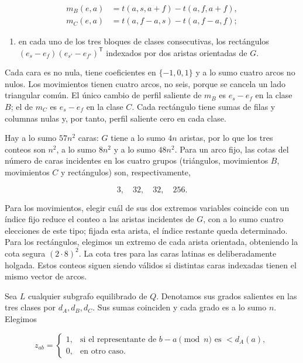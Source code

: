 \documentclass[spanish,11pt,a4paper]{article}
\providecommand{\tightlist}{\setlength{\itemsep}{0pt}\setlength{\parskip}{0pt}}
\begin{document}
\[\begin{aligned}m_B(e,a)&=t(a,s,a+f)-t(a,f,a+f),\\m_C(e,a)&=t(a,f-a,s)-t(a,f-a,f);\end{aligned}\]

\begin{enumerate}
\def\labelenumi{\arabic{enumi}.}
\setcounter{enumi}{2}
\tightlist
\item
  en cada uno de los tres bloques de clases consecutivas, los rectángulos \((e_s-e_f)(e_{s\prime}-e_{f\prime})^{\mathsf T}\) indexados por dos aristas orientadas de \(G\).
\end{enumerate}

Cada cara es no nula, tiene coeficientes en \(\{-1,0,1\}\) y a lo sumo cuatro arcos no nulos. Los movimientos tienen cuatro arcos, no seis, porque se cancela un lado triangular común. El único cambio de perfil saliente de \(m_{B}\) es \(e_{s}-e_{f}\) en la clase \(B\); el de \(m_{C}\) es \(e_{s}-e_{f}\) en la clase \(C\). Cada rectángulo tiene sumas de filas y columnas nulas y, por tanto, perfil saliente cero en cada clase.

Hay a lo sumo \(57n^{2}\) caras: \(G\) tiene a lo sumo \(4n\) aristas, por lo que los tres conteos son \(n^{2}\), a lo sumo \(8n^{2}\) y a lo sumo \(48n^{2}\). Para un arco fijo, las cotas del número de caras incidentes en los cuatro grupos (triángulos, movimientos \(B\), movimientos \(C\) y rectángulos) son, respectivamente,

\[3,\quad32,\quad32,\quad256.\tag{F.4}\]

Para los movimientos, elegir cuál de sus dos extremos variables coincide con un índice fijo reduce el conteo a las aristas incidentes de \(G\), con a lo sumo cuatro elecciones de este tipo; fijada esta arista, el índice restante queda determinado. Para los rectángulos, elegimos un extremo de cada arista orientada, obteniendo la cota segura \((2\cdot 8)^{2}\). La cota tres para las caras latinas es deliberadamente holgada. Estos conteos siguen siendo válidos si distintas caras indexadas tienen el mismo vector de arcos.

Sea \(L\) cualquier subgrafo equilibrado de \(Q\). Denotamos sus grados salientes en las tres clases por \(d_{A},d_{B},d_{C}\). Sus sumas coinciden y cada grado es a lo sumo \(n\). Elegimos

\[z_{ab}=\begin{cases}1,&\text{si el representante de }b-a\pmod n\text{ es }<d_A(a),\\0,&\text{en otro caso.}\end{cases}\]
\end{document}
